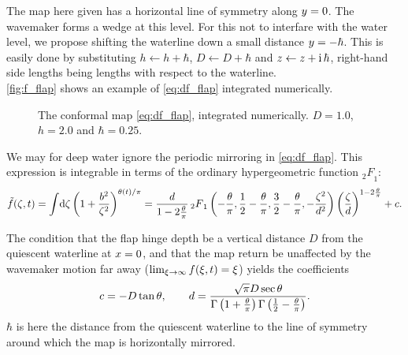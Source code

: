 The map here given has a horizontal line of symmetry along $y=0$. The wavemaker forms a wedge at this level. 
For this not to interfare with the water level, we propose shifting the waterline down a small distance $y=-\hbar$.
This is easily done by substituting 
$h \leftarrow h + \hbar$, $D \leftarrow D + \hbar$ and $z \leftarrow z + \mathrm{i}\, \hbar$, right-hand side lengths being lengths with respect to the waterline.
\\

\autoref{fig:f_flap} shows an example of \eqref{eq:df_flap} integrated numerically.
\\
\begin{figure}[h!ptb]%
\centering
{}%
%
\caption{The conformal map \eqref{eq:df_flap}, integrated numerically.
$D=1.0$, $h=2.0$ and $\hbar = 0.25$.
}%
\label{fig:f_flap}%
\end{figure}



We may for deep water ignore the periodic mirroring in \eqref{eq:df_flap}.
This expression is integrable in terms of the  ordinary hypergeometric function ${_2F}_1$:
\begin{equation}
\tilde{f}(\zeta,t) = \int\!\mathrm d\zeta\left(1+\frac{b^2}{\zeta^2}\right)^{\theta(t)/\pi}=\frac{d}{1-2\frac\theta\pi}\,{_2F}_1\left(-\frac{\theta}{\pi},\frac12-\frac{\theta}{\pi},\frac32-\frac{\theta}{\pi},-\frac{\zeta^2}{d^2}\right)\left(\frac{\zeta}{d}\right)^{1-2\frac\theta\pi} + c.
\label{eq:f_flap}
\end{equation}

The condition that the flap hinge depth be a vertical distance $D$ from the quiescent waterline at $x=0$, and that the map return be unaffected by the wavemaker motion far away ($\lim_{\xi\to\infty}f(\xi,t) = \xi$) yields the coefficients
\begin{align*}
c = -D\tan\theta,\qquad
d =  \frac{\sqrt\pi D\sec\theta}{\Gamma\left(1+\frac\theta\pi\right)\Gamma\left(\frac12-\frac\theta\pi\right)}.
\end{align*} 
$\hbar$ is here the distance from the quiescent waterline to the line of symmetry around which the map is horizontally mirrored.

